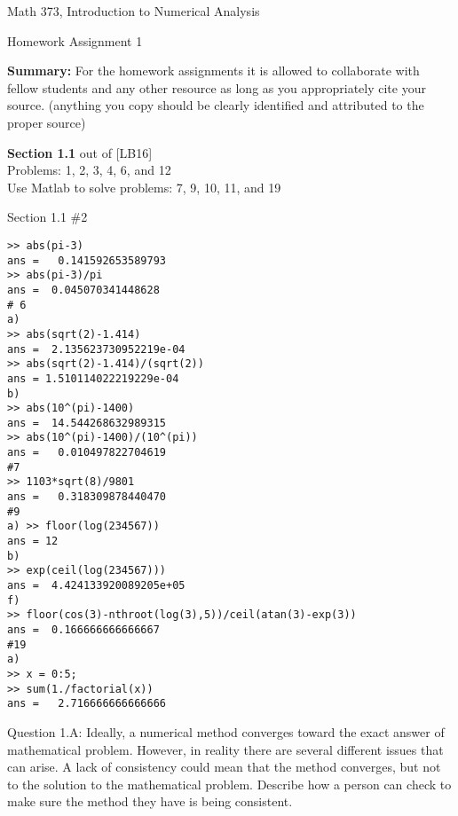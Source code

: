 \documentclass{article}
\renewcommand{\cite}[1]{[#1]}
\begin{document}

\large

{\Large Math 373, Introduction to Numerical Analysis}


{\Large Homework Assignment 1} 

{\bf Summary:} {\color{red} For the homework assignments it is allowed to collaborate with fellow students and any other resource as long as you appropriately cite your source. (anything you copy should be clearly identified and attributed to the proper source)  } 
\par \bigskip \par \noindent
%

{\bf Section 1.1} out of \cite{LB16} \\
Problems: 1,  2,  3,  4,  6, and 12 \\
Use Matlab to solve problems: 7, 9, 10, 11, and 19 \par \medskip \noindent
%
{\color{teal} Section 1.1 \#2
\begin{verbatim}
>> abs(pi-3)
ans =   0.141592653589793
>> abs(pi-3)/pi
ans =  0.045070341448628
# 6 
a) 
>> abs(sqrt(2)-1.414)
ans =  2.135623730952219e-04
>> abs(sqrt(2)-1.414)/(sqrt(2))
ans = 1.510114022219229e-04
b)
>> abs(10^(pi)-1400)
ans =  14.544268632989315
>> abs(10^(pi)-1400)/(10^(pi))
ans =   0.010497822704619
#7
>> 1103*sqrt(8)/9801
ans =   0.318309878440470
#9
a) >> floor(log(234567))    
ans = 12
b) 
>> exp(ceil(log(234567)))
ans =  4.424133920089205e+05
f)
>> floor(cos(3)-nthroot(log(3),5))/ceil(atan(3)-exp(3))
ans =  0.166666666666667
#19
a)
>> x = 0:5;
>> sum(1./factorial(x))
ans =   2.716666666666666
\end{verbatim}
}%
Question 1.A: Ideally, a numerical method converges toward the exact answer of mathematical problem. However, in reality there are several different issues that can arise. A lack of consistency could mean that the method converges, but not to the solution to the mathematical problem. Describe how a person can check to make sure the method they have is being consistent. 
\end{document}

